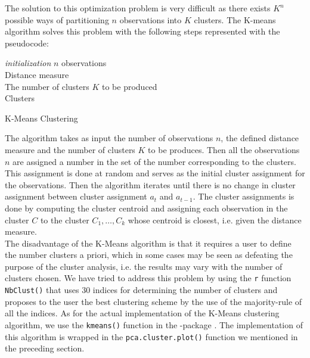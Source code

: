 \documentclass[../thesis.tex]{subfiles}
\begin{document}
\noindent The solution to this optimization problem is very difficult as there exists $K^n$ possible ways of partitioning $n$ observations into $K$ clusters. The K-means algorithm solves this problem with the following steps represented with the pseudocode:\\
\begin{algorithm}[H]{
\SetAlgoLined
\textit{initialization}\;
    \hspace*{0,5cm}$n$ observations\\
    \hspace*{0,5cm}Distance measure\\
    \hspace*{0,5cm}The number of clusters $K$ to be produced\\
    \Return Clusters
}
\caption{K-Means Clustering}
\end{algorithm}

\noindent The algorithm takes as input the number of observations $n$, the defined distance measure and the number of clusters $K$ to be produces. Then all the observations $n$ are assigned a number in the set of the number corresponding to the clusters. This assignment is done at random and serves as the initial cluster assignment for the observations. Then the algorithm iterates until there is no change in cluster assignment between cluster assignment $a_t$ and $a_{t-1}$. The cluster assignments is done by computing the cluster centroid and assigning each observation in the cluster $C$ to the cluster $C_1, \hdots, C_k$ whose centroid is closest, i.e. given the distance measure. \\
\indent The disadvantage of the K-Means algorithm is that it requires a user to define the number clusters a priori, which in some cases may be seen as defeating the purpose of the cluster analysis, i.e. the results may vary with the number of clusters chosen. We have tried to address this problem by using the \texttt{r} function \texttt{NbClust()} \citep{nbclust} that uses 30 indices for determining the number of clusters and proposes to the user the best clustering scheme by the use of the majority-rule of all the indices. As for the actual implementation of the K-Means clustering algorithm, we use the \texttt{kmeans()} function in the -package \citep{stats}. The implementation of this algorithm is wrapped in the \texttt{pca.cluster.plot()} function we mentioned in the preceding section.
\end{document}

